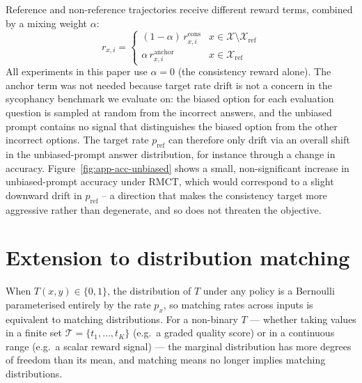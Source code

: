 \documentclass{article}
\begin{document}
Reference and non-reference trajectories receive different reward terms,
combined by a mixing weight $\alpha$:
\begin{equation}
r_{x,i} =
\begin{cases}
(1-\alpha)\, r^{\text{cons}}_{x,i} & x \in \mathcal{X} \setminus \mathcal{X}_{\text{ref}} \\
\alpha\, r^{\text{anchor}}_{x,i} & x \in \mathcal{X}_{\text{ref}}
\end{cases}
\end{equation}
All experiments in this paper use $\alpha = 0$ (the consistency reward alone). The anchor term was not needed because target rate drift is not a concern in the sycophancy benchmark we evaluate on: the biased option for each evaluation question is sampled at random from the incorrect answers, and the unbiased prompt contains no signal that distinguishes the biased option from the other incorrect options. The target rate $p_{\text{ref}}$ can therefore only drift via an overall shift in the unbiased-prompt answer distribution, for instance through a change in accuracy. Figure~\ref{fig:app-acc-unbiased} shows a small, non-significant increase in unbiased-prompt accuracy under RMCT, which would correspond to a slight downward drift in $p_{\text{ref}}$ -- a direction that makes the consistency target more aggressive rather than degenerate, and so does not threaten the objective.

\section{Extension to distribution matching}
\label{app:distribution-matching}

When $T(x, y) \in \{0,1\}$, the distribution of $T$ under any policy is a Bernoulli parameterised entirely by the rate $p_x$, so matching rates across inputs is equivalent to matching distributions. For a non-binary $T$ — whether taking values in a finite set $\mathcal{T} = \{t_1, \ldots, t_K\}$ (e.g.\ a graded quality score) or in a continuous range (e.g.\ a scalar reward signal) — the marginal distribution has more degrees of freedom than its mean, and matching means no longer implies matching distributions.
\end{document}
